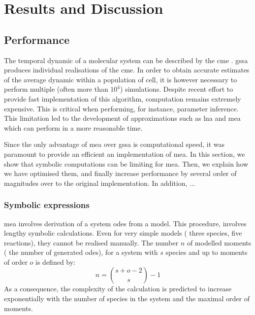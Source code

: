 \section{Results and Discussion} \label{results}

\subsection{Performance}\label{performance}
The temporal dynamic of a molecular system can be described by the \gls{cme} .
\gls{gssa}\cite{gillespie_general_1976} produces individual realisations of the \gls{cme}.
In order to obtain accurate estimates of the average dynamic within a population of cell, it is however necessary to perform multiple (often more than $10^4$) simulations.
Despite recent effort \cite{niemi_efficient_2011,dittamo_optimized_2009,komarov_accelerating_2012} to provide fast implementation of this algorithm, computation remains extremely expensive.
This is critical when performing, for instance, parameter inference.
This limitation led to the development of approximations such as \gls{lna}\cite{komorowski_bayesian_2009} and \gls{mea}\cite{ale_general_2013} which can perform in a more reasonable time.

Since the only advantage of \gls{mea} over \gls{gssa} is computational speed, it was paramount to provide an efficient an implementation of \gls{mea}.
In this section, we show that symbolic computations can be limiting for \gls{mea}.
Then, we explain how we have optimised them, and finally increase performance by several order of magnitudes over to the original \mat{} implementation.
In addition, ...\\


\subsubsection{Symbolic expressions}


\gls{mea} involves derivation of a system \gls{ode}s from a model.
This procedure\cite{ale_general_2013}, involves lengthy symbolic calculations.
Even for very simple models (\eg{} three species, five reactions), they cannot be realised manually.
The number $n$ of modelled moments (\ie{} the number of generated \gls{ode}s), for a system with $s$ species and up to moments of order $o$ is defined by:\\
\begin{equation}
n={{s+o-2} \choose {s}} -1
\end{equation}
As a consequence, the complexity of the calculation is predicted to increase exponentially with the number of species in the system and the maximal order of moments.

